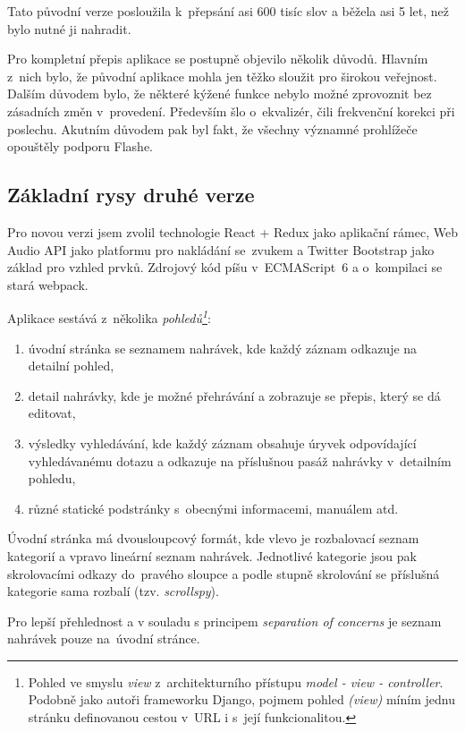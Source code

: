 Tato původní verze posloužila k~přepsání asi 600 tisíc slov a běžela asi 5 let,
než bylo nutné ji nahradit.

Pro kompletní přepis aplikace se postupně objevilo několik důvodů. Hlavním
z~nich bylo, že původní aplikace mohla jen těžko sloužit pro širokou veřejnost.
Dalším důvodem bylo, že některé kýžené funkce nebylo možné zprovoznit bez
zásadních změn v~provedení. Především šlo o~ekvalizér, čili frekvenční korekci
při poslechu. Akutním důvodem pak byl fakt, že všechny významné prohlížeče
opouštěly podporu Flashe.

\subsection{Základní rysy druhé verze}

Pro novou verzi jsem zvolil technologie React + Redux\cite{abramov2015redux} jako aplikační rámec, Web
Audio API\cite{adenot2013web} jako platformu pro nakládání se~zvukem a Twitter Bootstrap jako základ
pro vzhled prvků. Zdrojový kód píšu v~ECMAScript~6 a o~kompilaci se stará
webpack.

Aplikace sestává z~několika {\em pohledů\footnote{Pohled ve smyslu {\em view}
z~architekturního přístupu {\em model - view - controller}. Podobně jako autoři
frameworku Django, pojmem pohled {\em (view)} míním jednu stránku definovanou cestou
v~URL i s~její funkcionalitou.}}:
\begin{enumerate}
\item{úvodní stránka se seznamem nahrávek, kde každý záznam odkazuje na detailní
pohled,}
\item{detail nahrávky, kde je možné přehrávání a zobrazuje se přepis, který se dá
editovat,}
\item{výsledky vyhledávání, kde každý záznam obsahuje úryvek odpovídající
vyhledávanému dotazu a odkazuje na příslušnou pasáž nahrávky v~detailním
pohledu,}
\item{různé statické podstránky s~obecnými informacemi, manuálem atd.}
\end{enumerate}

Úvodní stránka má
dvousloupcový formát, kde vlevo je rozbalovací seznam kategorií a vpravo
lineární seznam nahrávek. Jednotlivé kategorie jsou pak skrolovacími odkazy
do~pravého sloupce a podle stupně skrolování se příslušná kategorie sama
rozbalí (tzv. {\em scrollspy}).

Pro lepší přehlednost a v souladu s principem {\em separation of concerns} je seznam
nahrávek pouze na~úvodní stránce.

